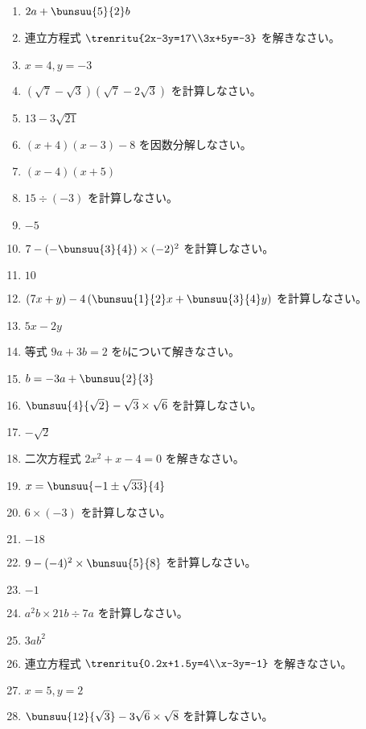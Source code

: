 \documentclass[uplatex,a4j,11pt]{jsreport}
\begin{document}
\begin{multicols}{2}
\begin{enumerate}
    \item $2a+\bunsuu{5}{2}b$
    \item 連立方程式 $\trenritu{2x-3y=17\\3x+5y=-3}$ を解きなさい。%
    \item $x=4, y=-3$
    \item $(\sqrt{7}-\sqrt{3})(\sqrt{7}-2\sqrt{3})$ を計算しなさい。%
    \item $13-3\sqrt{21}$
    \item $(x+4)(x-3)-8$ を因数分解しなさい。%
    \item $(x-4)(x+5)$
    \item $15\div (-3)$ を計算しなさい。%
    \item $-5$
    \item $7-\left(-\bunsuu{3}{4}\right)\times (-2)^2$ を計算しなさい。%
    \item $10$
    \item $(7x+y)-4\left(\bunsuu{1}{2}x+\bunsuu{3}{4}y\right)$ を計算しなさい。%
    \item $5x-2y$
    \item 等式 $9a+3b=2$ を$b$について解きなさい。%
    \item $b=-3a+\bunsuu{2}{3}$
    \item $\bunsuu{4}{\sqrt{2}}-\sqrt{3}\times \sqrt{6}$ を計算しなさい。%
    \item $-\sqrt{2}$
    \item 二次方程式 $2x^2+x-4=0$ を解きなさい。%
    \item $x=\bunsuu{-1\pm\sqrt{33}}{4}$
    \item $6\times (-3)$ を計算しなさい。%
    \item $-18$
    \item $9-(-4)^2\times \bunsuu{5}{8}$ を計算しなさい。%
    \item $-1$
    \item $a^2b\times21b\div 7a$ を計算しなさい。%
    \item $3ab^2$
    \item 連立方程式 $\trenritu{0.2x+1.5y=4\\x-3y=-1}$ を解きなさい。%
    \item $x=5, y=2$
    \item $\bunsuu{12}{\sqrt{3}}-3\sqrt{6}\times \sqrt{8}$ を計算しなさい。%

\end{enumerate}
\end{multicols}
\end{document}
